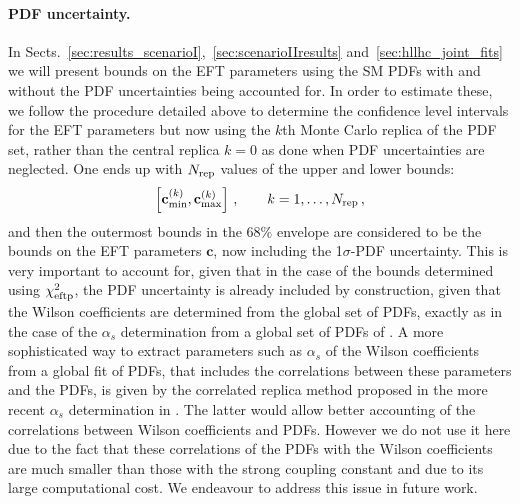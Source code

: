 \documentclass[withindex,glossary]{cam-thesis}
\begin{document}
\paragraph{PDF uncertainty.} In
Sects.~\ref{sec:results_scenarioI},~\ref{sec:scenarioIIresults}
and~\ref{sec:hllhc_joint_fits} we
will present bounds on the EFT parameters  using the SM PDFs
with and without the PDF uncertainties being accounted for.
%
In order to estimate these, we follow the procedure detailed above to
determine the confidence level intervals for the EFT parameters but now
using the $k$th Monte Carlo replica of the PDF set, rather than the central replica $k=0$
as done when PDF uncertainties are neglected.
%
One ends up with  $N_{\rm rep}$ values of
the upper and lower bounds:
\begin{equation}
\left[{\mathbf c}^{(k)}_{\rm min},{\mathbf c}^{(k)}_{\rm max}\right] \, ,\qquad k=1,\ldots,N_{\rm rep} \, ,
\end{equation}
and then the outermost bounds in the \(68\%\) envelope are considered to be the bounds
on the EFT parameters ${\mathbf c}$, now including the 1$\sigma$-PDF uncertainty.
%
This is very important to account for, given that in the case of the
bounds determined using $\chi^2_{\rm eftp}$, the PDF
uncertainty is already included by
construction, given that the Wilson coefficients are determined from the
global set of PDFs, exactly as in the case of the $\alpha_s$
determination from a global set of PDFs of
\cite{Lionetti:2011pw,Ball:2011us}. A more sophisticated way to
extract parameters such as $\alpha_s$ of the Wilson coefficients from
a global fit of PDFs, that includes the correlations between these parameters
and the PDFs, is given by the correlated replica method proposed in the more recent $\alpha_s$ determination in
\cite{Ball:2018iqk}. The latter would allow better accounting of the correlations
between Wilson coefficients and PDFs. However we do not use it here due to the fact that these correlations of the
PDFs with the Wilson coefficients are much smaller than those with the strong
coupling constant and due to its large computational cost. We endeavour to address this issue in future work.
\end{document}
